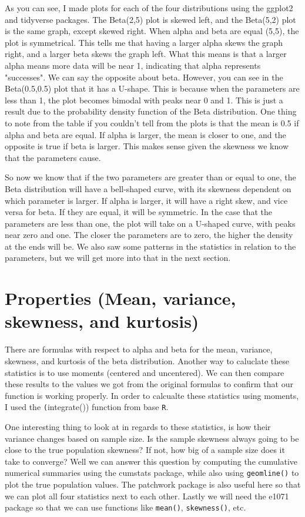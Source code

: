 \documentclass{article}\usepackage[]{graphicx}\usepackage[]{xcolor}
\begin{document}
\begin{multicols}{2}
As you can see, I made plots for each of the four distributions using the ggplot2 \citep{ggplot} and tidyverse \citep{tidyverse} packages. The Beta(2,5) plot is skewed left, and the Beta(5,2) plot is the same graph, except skewed right. When alpha and beta are equal (5,5), the plot is symmetrical. This tells me that having a larger alpha skews the graph right, and a larger beta skews the graph left. What this means is that a larger alpha means more data will be near 1, indicating that alpha represents "successes". We can say the opposite about beta. However, you can see in the Beta(0.5,0.5) plot that it has a U-shape. This is because when the parameters are less than 1, the plot becomes bimodal with peaks near 0 and 1. This is just a result due to the probability density function of the Beta distribution. One thing to note from the table if you couldn't tell from the plots is that the mean is 0.5 if alpha and beta are equal. If alpha is larger, the mean is closer to one, and the opposite is true if beta is larger. This makes sense given the skewness we know that the parameters cause.

So now we know that if the two parameters are greater than or equal to one, the Beta distribution will have a bell-shaped curve, with its skewness dependent on which parameter is larger. If alpha is larger, it will have a right skew, and vice versa for beta. If they are equal, it will be symmetric. In the case that the parameters are less than one, the plot will take on a U-shaped curve, with peaks near zero and one. The closer the parameters are to zero, the higher the density at the ends will be. We also saw some patterns in the statistics in relation to the parameters, but we will get more into that in the next section.
\section{Properties (Mean, variance, skewness, and kurtosis)}
There are formulas with respect to alpha and beta for the mean, variance, skewness, and kurtosis of the beta distribution. Another way to caluclate these statistics is to use moments (centered and uncentered). We can then compare these results to the values we got from the original formulas to confirm that our function is working properly. In order to calcualte these statistics using moments, I used the \texttt(integrate()) function from base \texttt{R}.

One interesting thing to look at in regards to these statistics, is how their variance changes based on sample size. Is the sample skewness always going to be close to the true population skewness? If not, how big of a sample size does it take to converge? Well we can answer this question by computing the cumulative numerical summaries using the cumstats \citep{cumstats} package, while also using \texttt{geom\textunderscore line()} to plot the true population values. The patchwork \citep{patchwork} package is also useful here so that we can plot all four statistics next to each other. Lastly we will need the e1071 \citep{e1071} package so that we can use functions like \texttt{mean()}, \texttt{skewness()}, etc.


\end{multicols}
\end{document}
